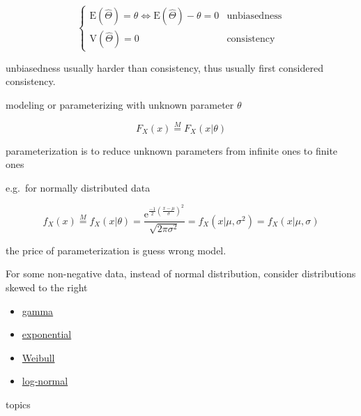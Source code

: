 \documentclass[
]{book}
\providecommand{\tightlist}{%
  \setlength{\itemsep}{0pt}\setlength{\parskip}{0pt}}
\theoremstyle{definition}
\theoremstyle{definition}
\theoremstyle{definition}
\theoremstyle{definition}
\theoremstyle{remark}
\begin{document}
\[
\begin{cases}
\mathrm{E}\left(\widehat{\Theta}\right)=\theta\Leftrightarrow\mathrm{E}\left(\widehat{\Theta}\right)-\theta=0 & \text{unbiasedness}\\
\mathrm{V}\left(\widehat{\Theta}\right)=0 & \text{consistency}
\end{cases}
\]

unbiasedness usually harder than consistency, thus usually first considered consistency.

modeling or parameterizing with unknown parameter \(\theta\)

\[
F_{{\scriptscriptstyle X}}\left(x\right)\overset{M}{=}F_{{\scriptscriptstyle X}}\left(x|\theta\right)
\]

parameterization is to reduce unknown parameters from infinite ones to finite ones

e.g.~for normally distributed data

\[
f_{{\scriptscriptstyle X}}\left(x\right)\overset{M}{=}f_{{\scriptscriptstyle X}}\left(x|\theta\right)=\dfrac{\mathrm{e}^{{\scriptscriptstyle \frac{-1}{2}\left(\frac{x-\mu}{\sigma}\right)^{2}}}}{\sqrt{2\pi\sigma^{2}}}=f_{{\scriptscriptstyle X}}\left(x|\mu,\sigma^{2}\right)=f_{{\scriptscriptstyle X}}\left(x|\mu,\sigma\right)
\]

the price of parameterization is guess wrong model.

For some non-negative data, instead of normal distribution, consider distributions skewed to the right

\begin{itemize}
\tightlist
\item
  \href{https://en.wikipedia.org/wiki/Gamma_distribution}{gamma}
\item
  \href{https://en.wikipedia.org/wiki/Exponential_distribution}{exponential}
\item
  \href{https://en.wikipedia.org/wiki/Weibull_distribution}{Weibull}
\item
  \href{https://en.wikipedia.org/wiki/Log-normal_distribution}{log-normal}
\end{itemize}

topics
\end{document}
